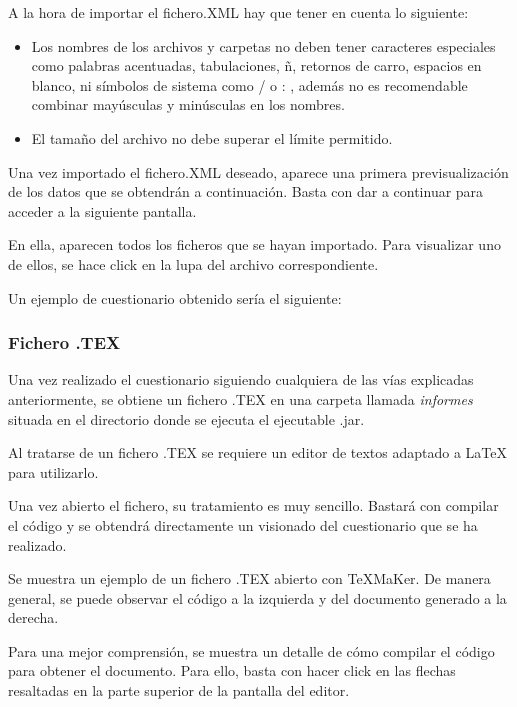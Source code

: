 A la hora de importar el fichero.XML hay que tener en cuenta lo siguiente:
\begin{itemize}
\item Los nombres de los archivos y carpetas no deben tener caracteres especiales como palabras acentuadas, tabulaciones, ñ, retornos de carro, espacios en blanco, ni símbolos de sistema como / o : , además no es recomendable combinar mayúsculas y minúsculas en los nombres.
\item El tamaño del archivo no debe superar el límite permitido.

\end{itemize} 

Una vez importado el fichero.XML deseado, aparece una primera previsualización de los datos que se obtendrán a continuación. Basta con dar a continuar para acceder a la siguiente pantalla.

En ella, aparecen todos los ficheros que se hayan importado. Para visualizar uno de ellos, se hace click en la lupa del archivo correspondiente.

Un ejemplo de cuestionario obtenido sería el siguiente:

\subsubsection{Fichero .TEX}

Una vez realizado el cuestionario siguiendo cualquiera de las vías explicadas anteriormente, se obtiene un fichero .TEX en una carpeta llamada \textit{informes} situada en el directorio donde se ejecuta el ejecutable .jar.

Al tratarse de un fichero .TEX se requiere un editor de textos adaptado a \LaTeX{} para utilizarlo.

Una vez abierto el fichero, su tratamiento es muy sencillo. Bastará con compilar el código y se obtendrá directamente un visionado del cuestionario que se ha realizado.

Se muestra un ejemplo de un fichero .TEX abierto con \TeX{}MaKer. De manera general, se puede observar el código a la izquierda y del documento generado a la derecha.


Para una mejor comprensión, se muestra un detalle de cómo compilar el código para obtener el documento. Para ello, basta con hacer click en las flechas resaltadas en la parte superior de la pantalla del editor.

